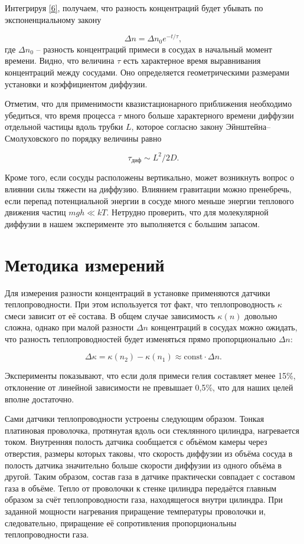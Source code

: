\documentclass[a4paper,12pt]{article} %
\begin{document}
Интегрируя \eqref{6}, получаем, что разность концентраций будет убывать по экспоненциальному закону

\begin{equation}\label{8}
\Delta n = \Delta n_0 e^{-t/\tau},
\end{equation}
где $ \Delta n_0 $ -- разность концентраций примеси в сосудах в начальный момент времени. Видно, что величина $ \tau $ есть характерное время выравнивания концентраций между сосудами. Оно определяется геометрическими размерами установки и коэффициентом диффузии.

Отметим, что для применимости квазистационарного приближения необходимо убедиться, что время процесса $ \tau $ много больше характерного времени диффузии отдельной частицы вдоль трубки $ L $, которое согласно закону Эйнштейна–Смолуховского по порядку величины равно

\begin{equation}\label{9}
\tau_\text{диф} \sim L^2/2D.
\end{equation}

Кроме того, если сосуды расположены вертикально, может возникнуть вопрос о влиянии силы тяжести на диффузию. Влиянием гравитации можно пренебречь, если перепад потенциальной энергии в сосуде много меньше энергии теплового движения частиц $ mgh \ll kT $. Нетрудно проверить, что для молекулярной диффузии в нашем эксперименте это выполняется с большим запасом.

\section{Методика измерений}

Для измерения разности концентраций в установке применяются датчики теплопроводности. При этом используется тот факт, что теплопроводность $ \kappa $ смеси зависит от её состава. В общем случае зависимость $ \kappa(n) $ довольно сложна, однако при малой разности $ \Delta n $ концентраций в сосудах можно ожидать, что разность теплопроводностей будет изменяться прямо пропорционально $ \Delta n $:

\[ \Delta \kappa = \kappa(n_2)-\kappa(n_1)\approx\text{const}\cdot\Delta n. \]

Эксперименты показывают, что если доля примеси гелия составляет менее
15\%, отклонение от линейной зависимости не превышает 0,5\%, что для наших целей вполне достаточно.

Сами датчики теплопроводности устроены следующим образом. Тонкая платиновая проволочка, протянутая вдоль оси стеклянного цилиндра, нагревается током. Внутренняя полость датчика сообщается с объёмом камеры через отверстия, размеры которых таковы, что скорость диффузии из объёма сосуда в полость датчика значительно больше скорости диффузии из одного объёма в другой. Таким образом, состав газа в датчике практически совпадает с составом газа в объёме. Тепло от проволочки к стенке цилиндра передаётся главным образом за счёт теплопроводности газа, находящегося внутри цилиндра. При заданной мощности нагревания приращение температуры проволочки и, следовательно, приращение её сопротивления пропорциональны теплопроводности газа.
\end{document}
